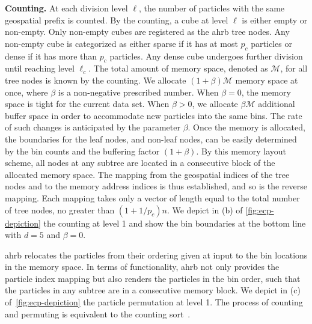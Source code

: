 \documentclass[final]{juliacon}
\begin{document}
\vspace{2pt} {\bf Counting.} At each division level $\ell$, the number
of particles with the same geospatial prefix is counted. By the
counting, a cube at level $\ell$ is either empty or non-empty. Only
non-empty cubes are registered as the {\sc ahrb} tree nodes. Any
non-empty cube is categorized as either sparse if it has at most
$p_{c}$ particles or dense if it has more than $p_c$ particles. Any
dense cube undergoes further division until reaching level
$\ell_{c}$. The total amount of memory space, denoted as
$\mathcal{M}$, for all tree nodes is known by the counting.  We
allocate $(1+\beta) \mathcal{M}$ memory space at once, where $\beta$
is a non-negative prescribed number.  When $\beta=0$, the memory space
is tight for the current data set. When $\beta >0$, we allocate
$\beta \mathcal{M}$ additional buffer space in order to accommodate
new particles into the same bins. The rate of such changes is
anticipated by the parameter $\beta$. Once the memory is allocated,
the boundaries for the leaf nodes, and non-leaf nodes, can be easily
determined by the bin counts and the buffering factor $(1+\beta)$. By
this memory layout scheme, all nodes at any subtree are located in a
consecutive block of the allocated memory space. The mapping from the
geospatial indices of the tree nodes and to the memory address indices
is thus established, and so is the reverse mapping. Each mapping takes
only a vector of length equal to the total number of tree nodes, no
greater than $(1+1/p_{c})n$. We depict in (b) of
\cref{fig:ecp-depiction} the counting at level 1 and show the bin
boundaries at the bottom line with $d=5$ and $\beta=0$.

\vspace{2pt}{\bf Permuting.} {\sc ahrb} relocates the particles from
their ordering given at input to the bin locations in the memory
space. In terms of functionality, {\sc ahrb} not only provides the
particle index mapping but also renders the particles in the bin
order, such that the particles in any subtree are in a consecutive
memory block. We depict in (c) of~\cref{fig:ecp-depiction} the
particle permutation at level 1. The process of counting and permuting
is equivalent to the counting sort~\cite{knuth1997}.



%
%
%
 
%
%
%
%
%
\end{document}
